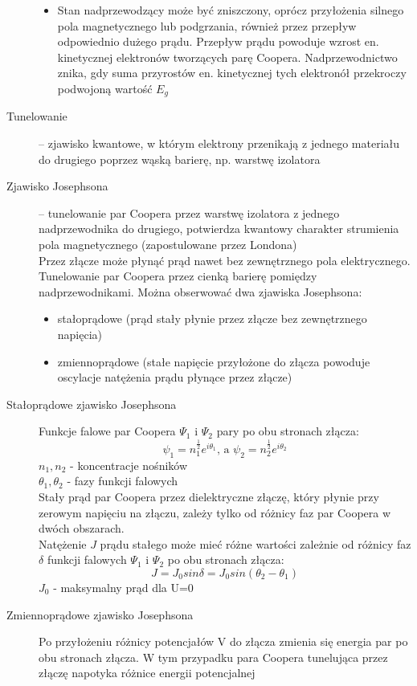 \documentclass[a4paper,11pt]{article}
\begin{document}
\begin{description}
\begin{itemize}
  \item Stan nadprzewodzący może być zniszczony, oprócz przyłożenia silnego pola magnetycznego lub podgrzania, również przez przepływ odpowiednio dużego prądu. Przepływ prądu powoduje wzrost en. kinetycznej elektronów tworzących parę Coopera. Nadprzewodnictwo znika, gdy suma przyrostów en. kinetycznej tych elektronół przekroczy podwojoną wartość $E_g$
  \end{itemize}
\item[Tunelowanie] -- zjawisko kwantowe, w którym elektrony przenikają z jednego materiału do drugiego poprzez wąską barierę, np. warstwę izolatora
\item[Zjawisko Josephsona] -- tunelowanie par Coopera przez warstwę izolatora z jednego nadprzewodnika do drugiego, potwierdza kwantowy charakter strumienia pola magnetycznego (zapostulowane przez Londona)\\
  Przez złącze może płynąć prąd nawet bez zewnętrznego pola elektrycznego. Tunelowanie par Coopera przez cienką barierę pomiędzy nadprzewodnikami. Można obserwować dwa zjawiska Josephsona:
  \begin{itemize}
  \item stałoprądowe (prąd stały płynie przez złącze bez zewnętrznego napięcia)
  \item zmiennoprądowe (stałe napięcie przyłożone do złącza powoduje oscylacje natężenia prądu płynące przez złącze)
  \end{itemize}
\item[Stałoprądowe zjawisko Josephsona] Funkcje falowe par Coopera $\Psi_1$ i $\Psi_2$ pary po obu stronach złącza:
  $$\psi_1 =n^\frac{1}{2}_1e^{i\theta_1}\text{, a }\psi_2=n^\frac{1}{2}_2e^{i\theta_2}$$
  $n_1,n_2$ - koncentracje nośników\\
  $\theta_1, \theta_2$ - fazy funkcji falowych\\
  Stały prąd par Coopera przez dielektryczne złączę, który płynie przy zerowym napięciu na złączu, zależy tylko od różnicy faz par Coopera w dwóch obszarach.\\
  Natężenie $J$ prądu stałego może mieć różne wartości zależnie od różnicy faz $\delta$ funkcji falowych $\Psi_1$ i $\Psi_2$ po obu stronach złącza:
  $$J=J_0sin\delta=J_0sin(\theta_2-\theta_1)$$
  $J_0$ - maksymalny prąd dla U=0
\item[Zmiennoprądowe zjawisko Josephsona] Po przyłożeniu różnicy potencjałów V do złącza zmienia się energia par po obu stronach złącza. W tym przypadku para Coopera tunelująca przez złączę napotyka różnice energii potencjalnej

\end{description}
\end{document}

